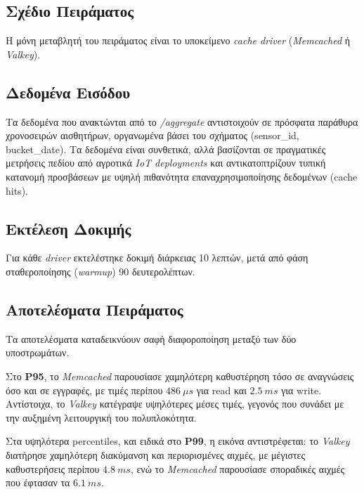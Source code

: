 \subsection{Σχέδιο Πειράματος}

Η μόνη μεταβλητή του πειράματος είναι το υποκείμενο \textit{cache driver}
(\textit{Memcached} ή \textit{Valkey}).

\subsection{Δεδομένα Εισόδου}

Τα δεδομένα που ανακτώνται από το \textit{/aggregate} αντιστοιχούν σε πρόσφατα
παράθυρα χρονοσειρών αισθητήρων, οργανωμένα βάσει του σχήματος (sensor\_id,
bucket\_date). Τα δεδομένα είναι συνθετικά, αλλά βασίζονται σε πραγματικές
μετρήσεις πεδίου από αγροτικά \textit{IoT deployments} και αντικατοπτρίζουν τυπική
κατανομή προσβάσεων με υψηλή πιθανότητα επαναχρησιμοποίησης δεδομένων (cache
hits).

\subsection{Εκτέλεση Δοκιμής}

Για κάθε \textit{driver} εκτελέστηκε δοκιμή διάρκειας 10 λεπτών, μετά από φάση
σταθεροποίησης (\textit{warm\-up}) 90 δευτερολέπτων.

\subsection{Αποτελέσματα Πειράματος}

Τα αποτελέσματα καταδεικνύουν σαφή διαφοροποίηση μεταξύ των δύο υποστρωμάτων.

Στο \textbf{P95}, το \textit{Memcached} παρουσίασε χαμηλότερη καθυστέρηση τόσο
σε αναγνώσεις όσο και σε εγγραφές, με τιμές περίπου $486\ \mu s$ για read και
$2.5\ ms$ για write. Αντίστοιχα, το \textit{Valkey} κατέγραψε υψηλότερες μέσες
τιμές, γεγονός που συνάδει με την αυξημένη λειτουργική του πολυπλοκότητα.

Στα υψηλότερα percentiles, και ειδικά στο \textbf{P99}, η εικόνα αντιστρέφεται:
το \textit{Valkey} διατήρησε χαμηλότερη διακύμανση και περιορισμένες αιχμές, με
μέγιστες καθυστερήσεις περίπου $4.8\ ms$, ενώ το \textit{Memcached} παρουσίασε
σποραδικές αιχμές που έφτασαν τα $6.1\ ms$.

